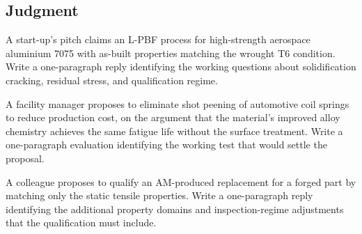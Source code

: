 \subsection*{Judgment}

\begin{exercise}
A start-up's pitch claims an L-PBF process for high-strength
aerospace aluminium 7075 with as-built properties matching the wrought
T6 condition. Write a one-paragraph reply identifying the working
questions about solidification cracking, residual stress, and
qualification regime.
\end{exercise}

\begin{exercise}
A facility manager proposes to eliminate shot peening of automotive
coil springs to reduce production cost, on the argument that the
material's improved alloy chemistry achieves the same fatigue life
without the surface treatment. Write a one-paragraph evaluation
identifying the working test that would settle the proposal.
\end{exercise}

\begin{exercise}
A colleague proposes to qualify an AM-produced replacement for a
forged part by matching only the static tensile properties. Write a
one-paragraph reply identifying the additional property domains and
inspection-regime adjustments that the qualification must include.
\end{exercise}
